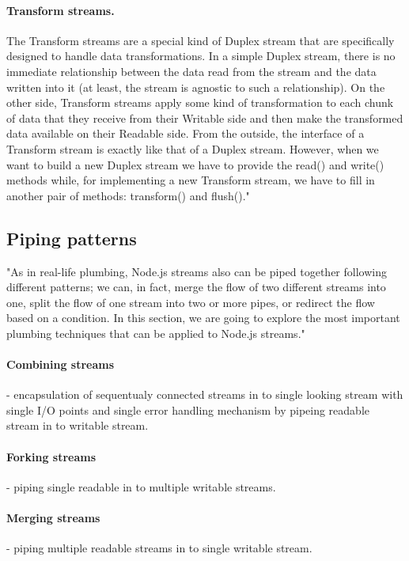 \paragraph{Transform streams.}
The Transform streams are a special kind of Duplex stream that are specifically designed to handle data transformations.
In a simple Duplex stream, there is no immediate relationship between the data read from the stream and the data written into it (at least, the stream is agnostic to such a relationship).
On the other side, Transform streams apply some kind of transformation to each chunk of data that they receive from their Writable side and then make the transformed data available on their Readable side.
From the outside, the interface of a Transform stream is exactly like that of a Duplex stream.
However, when we want to build a new Duplex stream we have to provide the read() and write() methods while, for implementing a new Transform stream, we have to fill in another pair of methods: transform() and flush()."\cite{nodejsbook}


\subsection{Piping patterns}
"As in real-life plumbing, Node.js streams also can be piped together following different patterns; we can, in fact, merge the flow of two different streams into one, split the flow of one stream into two or more pipes, or redirect the flow based on a condition. 
In this section, we are going to explore the most important plumbing techniques that can be applied to Node.js streams."\cite{nodejsbook}

\paragraph{Combining streams} - encapsulation of sequentualy connected streams in to single looking stream with single I/O points and single error handling mechanism by pipeing readable stream in to writable stream.\cite{nodejsbook}
\paragraph{Forking streams} - piping single readable in to multiple writable streams.\cite{nodejsbook}
\paragraph{Merging streams} - piping multiple readable streams in to single writable stream.\cite{nodejsbook}
